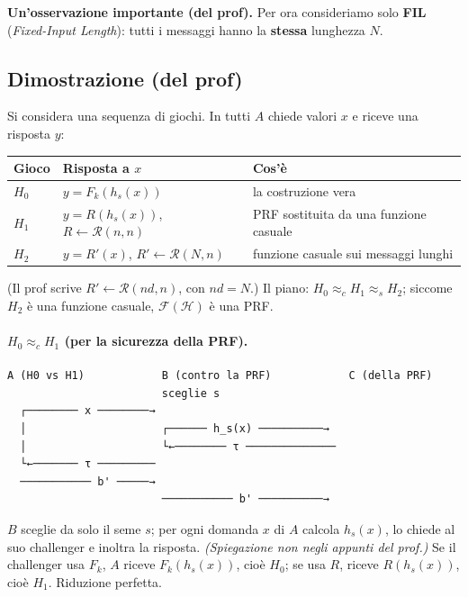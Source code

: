 \textbf{Un'osservazione importante (del prof).} Per ora consideriamo solo \textbf{FIL} (\emph{Fixed-Input Length}): tutti i messaggi hanno la \textbf{stessa} lunghezza \(N\).

\subsection{Dimostrazione (del prof)}

Si considera una sequenza di giochi. In tutti \(A\) chiede valori \(x\) e riceve una risposta \(y\):

\begin{center}
\begin{tabular}{lll}
\toprule
Gioco & Risposta a \(x\) & Cos'è \\
\midrule
\(H_0\) & \(y = F_k(h_s(x))\) & la costruzione vera \\
\(H_1\) & \(y = R(h_s(x))\), \(R \leftarrow \mathcal{R}(n, n)\) & PRF sostituita da una funzione casuale \\
\(H_2\) & \(y = R'(x)\), \(R' \leftarrow \mathcal{R}(N, n)\) & funzione casuale sui messaggi lunghi \\
\bottomrule
\end{tabular}
\end{center}

(Il prof scrive \(R' \leftarrow \mathcal{R}(nd, n)\), con \(nd = N\).) Il piano: \(H_0 \approx_c H_1 \approx_s H_2\); siccome \(H_2\) è una funzione casuale, \(\mathcal{F}(\mathcal{H})\) è una PRF.

\paragraph{\(H_0 \approx_c H_1\) (per la sicurezza della PRF).}

\begin{verbatim}
A (H0 vs H1)            B (contro la PRF)            C (della PRF)
                        sceglie s
  ┌──────── x ────────→
  │                     ┌────── h_s(x) ──────────→
  │                     └←──────── τ ──────────────
  └←─────── τ ─────────
  ─────────── b' ─────→
                        ─────────── b' ──────────→
\end{verbatim}

\(B\) sceglie da solo il seme \(s\); per ogni domanda \(x\) di \(A\) calcola \(h_s(x)\), lo chiede al suo challenger e inoltra la risposta. \emph{(Spiegazione non negli appunti del prof.)} Se il challenger usa \(F_k\), \(A\) riceve \(F_k(h_s(x))\), cioè \(H_0\); se usa \(R\), riceve \(R(h_s(x))\), cioè \(H_1\). Riduzione perfetta.

